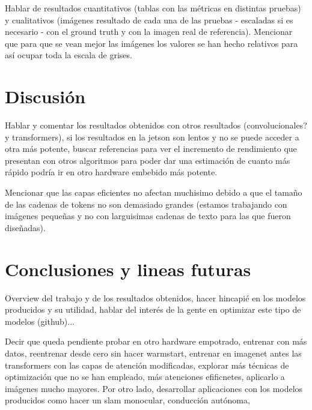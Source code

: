 \documentclass[a4paper]{article}
\begin{document}
Hablar de resultados cuantitativos (tablas con las métricas en distintas pruebas) y cualitativos (imágenes resultado de cada una de las pruebas - escaladas si es necesario - con el ground truth y con la imagen real de referencia). Mencionar que para que se vean mejor las imágenes los valores se han hecho relativos para así ocupar toda la escala de grises.

\clearpage
\section{Discusión}

Hablar y comentar los resultados obtenidos con otros resultados (convolucionales? y transformers), si los resultados en la jetson son lentos y no se puede acceder a otra más potente, buscar referencias para ver el incremento de rendimiento que presentan con otros algoritmos para poder dar una estimación de cuanto más rápido podría ir en otro hardware embebido más potente.

Mencionar que las capas eficientes no afectan muchisimo debido a que el tamaño de las cadenas de tokens no son demasiado grandes (estamos trabajando con imágenes pequeñas y no con larguisimas cadenas de texto para las que fueron diseñadas).

\clearpage
\section{Conclusiones y lineas futuras}
Overview del trabajo y de los resultados obtenidos, hacer hincapié en los modelos producidos y su utilidad, hablar del interés de la gente en optimizar este tipo de modelos (github)...


Decir que queda pendiente probar en otro hardware empotrado, entrenar con más datos, reentrenar desde cero sin hacer warmstart, entrenar en imagenet antes las transformers con las capas de atención modificadas, explorar más técnicas de optimización que no se han empleado, más atenciones efificnetes, aplicarlo a imágenes mucho mayores. Por otro lado, desarrollar aplicaciones con los modelos producidos como hacer un slam monocular, conducción autónoma, 
\end{document}
